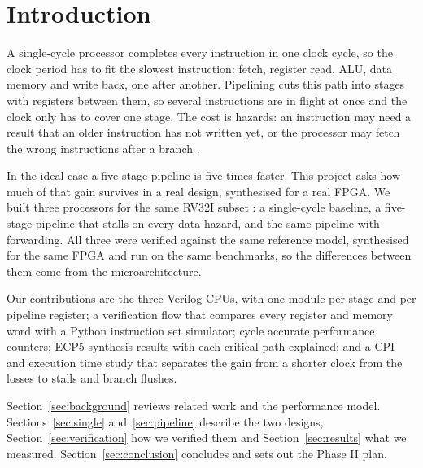 \section{Introduction}
\label{sec:intro}

A single-cycle processor completes every instruction in one clock cycle, so
the clock period has to fit the slowest instruction: fetch, register read,
ALU, data memory and write back, one after another. Pipelining cuts this path
into stages with registers between them, so several instructions are in
flight at once and the clock only has to cover one stage. The cost is hazards:
an instruction may need a result that an older instruction has not written
yet, or the processor may fetch the wrong instructions after a branch
\cite{patterson2021}.

In the ideal case a five-stage pipeline is five times faster. This project
asks how much of that gain survives in a real design, synthesised for a real
FPGA. We built three processors for the same RV32I subset \cite{riscvspec}: a
single-cycle baseline, a five-stage pipeline that stalls on every data
hazard, and the same pipeline with forwarding. All three were verified
against the same reference model, synthesised for the same FPGA and run on
the same benchmarks, so the differences between them come from the
microarchitecture.

Our contributions are the three Verilog CPUs, with one module per stage and
per pipeline register; a verification flow that compares every register and
memory word with a Python instruction set simulator; cycle accurate
performance counters; ECP5 synthesis results with each critical path
explained; and a CPI and execution time study that separates the gain from a
shorter clock from the losses to stalls and branch flushes.

Section~\ref{sec:background} reviews related work and the performance model.
Sections~\ref{sec:single} and~\ref{sec:pipeline} describe the two designs,
Section~\ref{sec:verification} how we verified them and
Section~\ref{sec:results} what we measured. Section~\ref{sec:conclusion}
concludes and sets out the Phase II plan.
